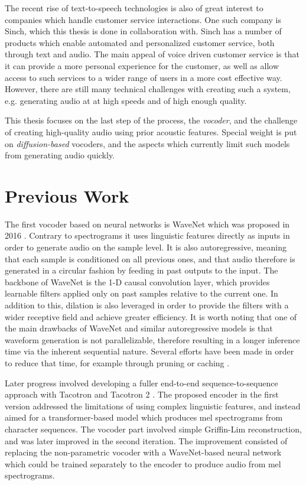\documentclass{report}
\begin{document}
The recent rise of text-to-speech technologies is also of great interest to companies which handle  customer service interactions. One such company is Sinch, which this thesis is done in collaboration with. Sinch has a number of products which enable automated and personalized customer service, both through text and audio. The main appeal of voice driven customer service is that it can provide a more personal experience for the customer, as well as allow access to such services to a wider range of users in a more cost effective way. However, there are still many technical challenges with creating such a system, e.g. generating audio at at high speeds and of high enough quality.

This thesis focuses on the last step of the process, the \textit{vocoder}, and the challenge of creating high-quality audio using prior acoustic features. Special weight is put on \textit{diffusion-based} vocoders, and the aspects which currently limit such models from generating audio quickly.

\section{Previous Work}
The first vocoder based on neural networks is WaveNet which was proposed in 2016 \cite{oord2016wavenet}. Contrary to spectrograms it uses linguistic features directly as inputs in order to generate audio on the sample level. It is also autoregressive, meaning that each sample is conditioned on all previous ones, and that audio therefore is generated in a circular fashion by feeding in past outputs to the input. The backbone of WaveNet is the 1-D causal convolution layer, which provides learnable filters applied only on past samples relative to the current one. In addition to this, dilation is also leveraged in order to provide the filters with a wider receptive field and achieve greater efficiency. It is worth noting that one of the main drawbacks of WaveNet and similar autoregressive models is that waveform generation is not parallelizable, therefore resulting in a longer inference time via the inherent sequential nature. Several efforts have been made in order to reduce that time, for example through pruning or caching \cite{kalchbrenner2018efficient, paine2016fast}.

Later progress involved developing a fuller end-to-end sequence-to-sequence approach with Tacotron \cite{wang2017tacotron} and Tacotron 2 \cite{shen2018natural}. The proposed encoder in the first version addressed the limitations of using complex linguistic features, and instead aimed for a transformer-based model which produces mel spectrograms from character sequences. The vocoder part involved simple Griffin-Lim reconstruction, and was later improved in the second iteration. The improvement consisted of replacing the non-parametric vocoder with a WaveNet-based neural network which could be trained separately to the encoder to produce audio from mel spectrograms.
\end{document}
